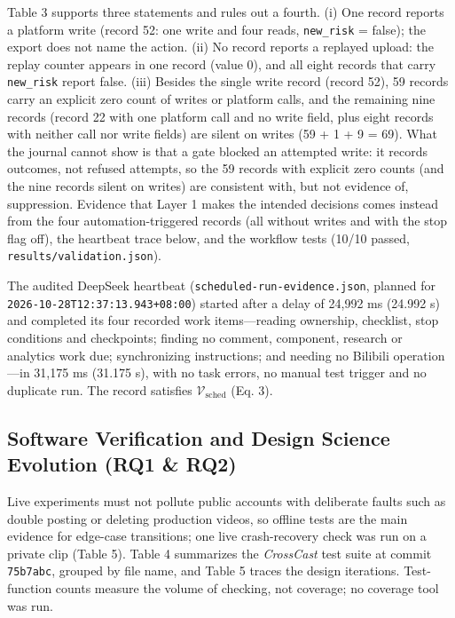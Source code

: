 \documentclass[11pt,a4paper]{article}
\theoremstyle{definition}
\begin{document}
Table 3 supports three statements and rules out a fourth. (i) One record reports a platform write (record 52: one write and four reads, \texttt{new\_risk} = false); the export does not name the action. (ii) No record reports a replayed upload: the replay counter appears in one record (value 0), and all eight records that carry \texttt{new\_risk} report false. (iii) Besides the single write record (record 52), 59 records carry an explicit zero count of writes or platform calls, and the remaining nine records (record 22 with one platform call and no write field, plus eight records with neither call nor write fields) are silent on writes (59 + 1 + 9 = 69). What the journal cannot show is that a gate blocked an attempted write: it records outcomes, not refused attempts, so the 59 records with explicit zero counts (and the nine records silent on writes) are consistent with, but not evidence of, suppression. Evidence that Layer 1 makes the intended decisions comes instead from the four automation-triggered records (all without writes and with the stop flag off), the heartbeat trace below, and the workflow tests (10/10 passed, \texttt{results/\allowbreak{}validation.\allowbreak{}json}).

The audited DeepSeek heartbeat (\texttt{scheduled-\allowbreak{}run-\allowbreak{}evidence.\allowbreak{}json}, planned for \texttt{2026\allowbreak{}-\allowbreak{}10-\allowbreak{}28T12:37:13.\allowbreak{}943+08:00}) started after a delay of 24,992 ms (24.992 s) and completed its four recorded work items---reading ownership, checklist, stop conditions and checkpoints; finding no comment, component, research or analytics work due; synchronizing instructions; and needing no Bilibili operation---in 31,175 ms (31.175 s), with no task errors, no manual test trigger and no duplicate run. The record satisfies $\mathcal{V}_{\text{sched}}$ (Eq. 3).

\subsection{Software Verification and Design Science Evolution (RQ1 \& RQ2)}
\label{sec:6.2}

Live experiments must not pollute public accounts with deliberate faults such as double posting or deleting production videos, so offline tests are the main evidence for edge-case transitions; one live crash-recovery check was run on a private clip (Table 5). Table 4 summarizes the \emph{CrossCast} test suite at commit \texttt{75b7abc}, grouped by file name, and Table 5 traces the design iterations. Test-function counts measure the volume of checking, not coverage; no coverage tool was run.
\end{document}
